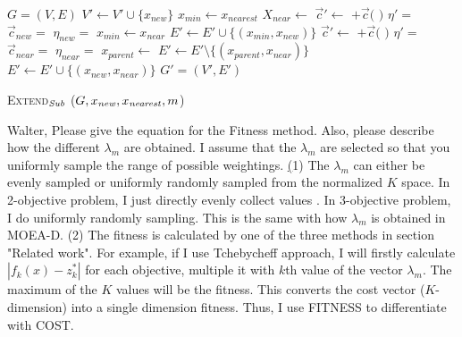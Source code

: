 \documentclass[conference]{IEEEtran}
\begin{document}
\begin{algorithm}[hbtp]
\begin{algorithmic}[1]
	\Return $G=(V,E)$ 
\EndIf
\State $ V' \leftarrow V' \cup \{ x_{new} \} $
\State $ x_{min} \leftarrow x_{nearest} $
\State $ X_{near} \leftarrow $ 
			\State $ \vec{c}' \leftarrow $  $ + \vec{c}( $  $ ) $ 
			\State $ \eta' =  $ 
			\State $ \vec{c}_{new} = $  
			\State $ \eta_{new} = $ 
				\State $ x_{min} \leftarrow x_{near} $
			\EndIf
		\EndIf
	\EndFor
	\State $ E' \leftarrow E' \cup \{ ( x_{min}, x_{new} ) \} $
{}
		\State $ \vec{c}' \leftarrow $  $ + \vec{c}( $  $ ) $ 
		\State $ \eta' =  $ 
		\State $ \vec{c}_{near} = $  
		\State $ \eta_{near} = $ 
			\State $ x_{parent} \leftarrow $ 
			\State $ E' \leftarrow E' \setminus \{ ( x_{parent}, x_{near} ) \} $
			\State $ E' \leftarrow E' \cup \{ ( x_{new}, x_{near} ) \} $
		\EndIf
	\EndIf
\EndFor
\Return $ G' = (V', E') $ 
\end{algorithmic}
\caption{ \textsc{Extend}$_{\it Sub} $ ($ G, x_{\it new}, x_{\it nearest},m$) }
\label{alg:morrtstar:extend:sub}
\end{algorithm} 

{\sc Walter, Please give the equation for the Fitness method.  Also, please describe how the different $\lambda_m$ are obtained.  I assume that the $\lambda_m$ are selected so that you uniformly sample the range of possible weightings.}
{\sc \underline  
(1) The $ \lambda_{m} $ can either be evenly sampled 
or uniformly randomly sampled from the normalized $ K $ space.
In 2-objective problem, I just directly evenly collect values .
In 3-objective problem, I do uniformly randomly sampling.
This is the same with how $ \lambda_{m} $ is obtained in MOEA-D.
(2) The fitness is calculated by one of the three methods in section "Related work".
For example, if I use Tchebycheff approach,
I will firstly calculate $ | f_k(x) - z^{*}_{k} | $ for each objective, multiple it with $ k $th value of the vector $ \lambda_m $.
The maximum of the $ K $ values will be the fitness.
This converts the cost vector ($ K $-dimension) into a single dimension fitness.
Thus, I use FITNESS to differentiate with COST.
}
\end{document}
